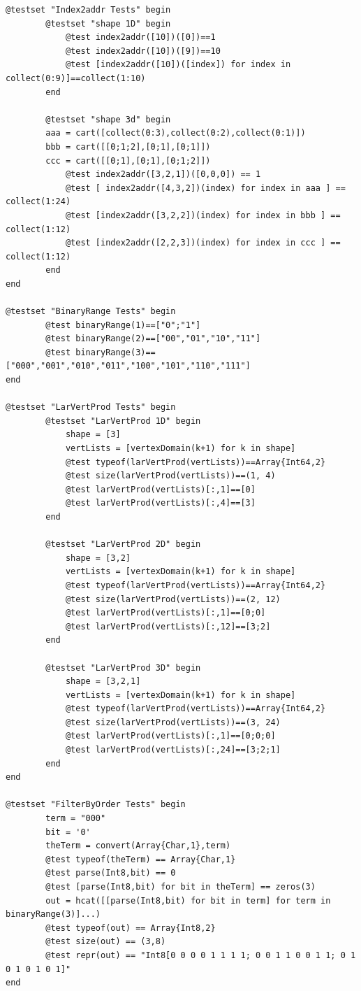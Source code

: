 \documentclass{article}
\begin{document}
\begin{flushleft}\small
\begin{list}{}{} \item
\begin{Verbatim}[tabsize=4]
@testset "Index2addr Tests" begin
		@testset "shape 1D" begin
			@test index2addr([10])([0])==1
			@test index2addr([10])([9])==10
			@test [index2addr([10])([index]) for index in collect(0:9)]==collect(1:10)
		end

		@testset "shape 3d" begin
		aaa = cart([collect(0:3),collect(0:2),collect(0:1)])
		bbb = cart([[0;1;2],[0;1],[0;1]])
		ccc = cart([[0;1],[0;1],[0;1;2]])
			@test index2addr([3,2,1])([0,0,0]) == 1
			@test [ index2addr([4,3,2])(index) for index in aaa ] == collect(1:24)
			@test [index2addr([3,2,2])(index) for index in bbb ] == collect(1:12)
			@test [index2addr([2,2,3])(index) for index in ccc ] == collect(1:12)
		end
end

@testset "BinaryRange Tests" begin
		@test binaryRange(1)==["0";"1"]
		@test binaryRange(2)==["00","01","10","11"]
		@test binaryRange(3)==["000","001","010","011","100","101","110","111"]
end

@testset "LarVertProd Tests" begin
		@testset "LarVertProd 1D" begin
			shape = [3]
			vertLists = [vertexDomain(k+1) for k in shape]
			@test typeof(larVertProd(vertLists))==Array{Int64,2}
			@test size(larVertProd(vertLists))==(1, 4)
			@test larVertProd(vertLists)[:,1]==[0]
			@test larVertProd(vertLists)[:,4]==[3]
		end

		@testset "LarVertProd 2D" begin
			shape = [3,2]
			vertLists = [vertexDomain(k+1) for k in shape]
			@test typeof(larVertProd(vertLists))==Array{Int64,2}
			@test size(larVertProd(vertLists))==(2, 12)
			@test larVertProd(vertLists)[:,1]==[0;0]
			@test larVertProd(vertLists)[:,12]==[3;2]
		end

		@testset "LarVertProd 3D" begin
			shape = [3,2,1]
			vertLists = [vertexDomain(k+1) for k in shape]
			@test typeof(larVertProd(vertLists))==Array{Int64,2}
			@test size(larVertProd(vertLists))==(3, 24)
			@test larVertProd(vertLists)[:,1]==[0;0;0]
			@test larVertProd(vertLists)[:,24]==[3;2;1]
		end
end

@testset "FilterByOrder Tests" begin
		term = "000"
		bit = '0'
		theTerm = convert(Array{Char,1},term)
		@test typeof(theTerm) == Array{Char,1}
		@test parse(Int8,bit) == 0
		@test [parse(Int8,bit) for bit in theTerm] == zeros(3)
		out = hcat([[parse(Int8,bit) for bit in term] for term in binaryRange(3)]...)
		@test typeof(out) == Array{Int8,2}
		@test size(out) == (3,8)
		@test repr(out) == "Int8[0 0 0 0 1 1 1 1; 0 0 1 1 0 0 1 1; 0 1 0 1 0 1 0 1]"
end
	

\end{Verbatim}
\end{list}
\end{flushleft}
\end{document}

